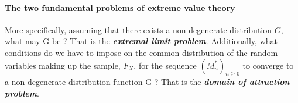 \paragraph{The two fundamental problems of extreme value theory} More specifically, assuming that there exists a non-degenerate distribution $G$, what may G be ? That is the \textit{\textbf{extremal limit problem}}. Additionally, what conditions do we have to impose on the common distribution of the random variables making up the sample, $F_X$, for the sequence $(M^{*}_n)_{n \ge 0}$ to converge to a non-degenerate distribution function G ? That is the \textit{\textbf{domain of attraction problem}}.



